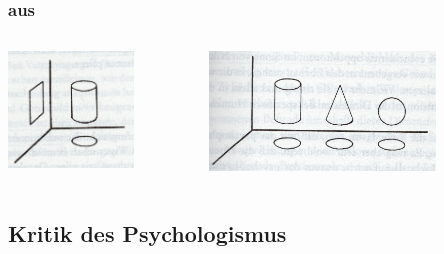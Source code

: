 \documentclass{beamer}
\begin{document}
\begin{frame}
\frametitle{aus \textcite{Frankl2015}}

\begin{columns}
      \includegraphics[width=0.7\textwidth]{resources/dimensionen1.png}
      
      \includegraphics[width=0.75\textwidth]{resources/dimensionen2.png}
\end{columns}

\end{frame}


\subsection{Kritik des Psychologismus}
\end{document}
